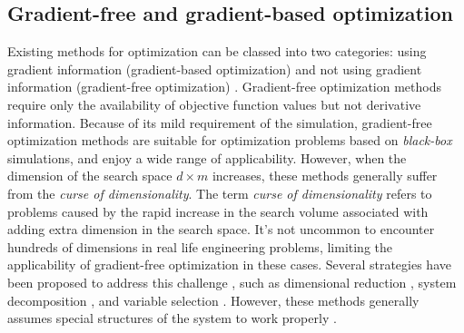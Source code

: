 \documentclass[a4paper,onecolumn]{article}
\theoremstyle{remark}
\begin{document}
\subsection{Gradient-free and gradient-based optimization}
\label{gradfree_gradbased}
\noindent Existing methods for optimization can be classed into two categories: 
using gradient information (gradient-based optimization) and not using gradient information (gradient-free optimization)
\cite{hanmaster, Opt Koziel Book}.
Gradient-free optimization methods require only the availability of objective function values but
not derivative information\cite{gradfreereview}. Because of its mild requirement of the simulation, 
gradient-free optimization methods are suitable for optimization problems based
on \textit{black-box} simulations, and enjoy a wide range of applicability. However, when the dimension of the search space 
$d\times m$ increases, these methods generally suffer from the \textit{curse of dimensionality}.
The term \textit{curse of dimensionality} refers to problems caused by the rapid increase in the search volume associated
with adding extra dimension in the search space\cite{dynamicprogramming}. It's not uncommon to encounter
hundreds of dimensions in real life engineering problems, limiting the applicability of gradient-free optimization
in these cases.
Several strategies have been proposed to address this challenge
\cite{survey of high dimensional blackbox optimization}, such as
dimensional reduction \cite{dimensional reduction}, system decomposition \cite{decomposition},
and variable selection \cite{variable selection}. However, these methods generally assumes
special structures of the system to work properly \cite{survey of high dimensional blackbox 
optimization}.\\
\end{document}
